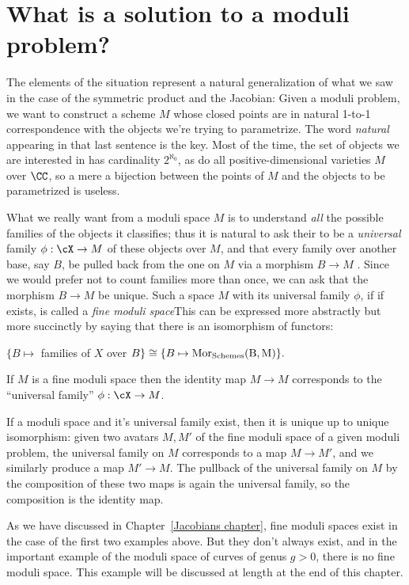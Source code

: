 \section{What is a solution to a moduli problem?}

The elements of the situation represent a natural generalization of what we saw in the case of the symmetric product and the Jacobian:
Given a moduli problem, we want to construct a scheme $M$ whose closed points are in natural  1-to-1 correspondence with the objects we're trying to parametrize. The word \emph{natural} appearing in that last sentence is the key. Most of the time, the set of objects we are interested in has cardinality $2^{\aleph_0}$, as do all positive-dimensional varieties $M$ over $\CC$, so a mere a bijection between the points of $M$ and the objects to be parametrized is useless.

What we really want from a moduli space $M$ is to understand \emph{all} the possible families of the objects it classifies; thus it is natural to ask their to be a \emph{universal} family $\phi: \cX\to M$ of these objects over $M$,
and that every family over another base, say $B$,  be pulled back from the one on $M$ via a morphism $B\to M$ . Since we would prefer not to count families more than once, we can ask that the 
morphism $B\to M$ be unique. Such a space $M$ with its universal family $\phi$, if if exists, is called a \emph{fine moduli space}This can be expressed more abstractly but more succinctly by saying that there is an isomorphism of functors:

\centerline{
$\{ B \mapsto$ families of $X$ over $B \} \cong \{ B\mapsto \rm{Mor}_{\rm Schemes}(B, M) \}.$
}
If $M$ is a fine moduli space then the identity map $M\to M$ corresponds to the ``universal family'' $\phi: \cX \to M$. 

If a moduli space and it's universal family exist, then it is unique up to unique isomorphism: given two avatars $M,M'$ of the fine moduli space of a given moduli problem,
the universal family on $M$ corresponds to a map $M\to M'$, and we similarly produce a map $M'\to M$. The pullback of the universal family on $M$ by the composition of these two maps is again the universal family, so the composition is the identity map.

As we have discussed in Chapter~\ref{Jacobians chapter}, fine moduli spaces exist in the case
of the first two examples above. But they don't always exist, and in the important example
of the moduli space of curves of genus $g>0$, there is no fine moduli space.  This example
will be discussed at length at the end of this chapter.


